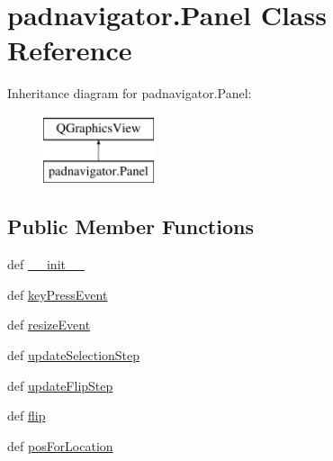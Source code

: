 \hypertarget{classpadnavigator_1_1Panel}{}\section{padnavigator.\+Panel Class Reference}
\label{classpadnavigator_1_1Panel}
Inheritance diagram for padnavigator.\+Panel\+:\begin{figure}[H]
\begin{center}
\leavevmode
\includegraphics[height=2.000000cm]{classpadnavigator_1_1Panel}
\end{center}
\end{figure}
\subsection*{Public Member Functions}
\begin{DoxyCompactItemize}
\item 
def \hyperlink{classpadnavigator_1_1Panel_a69cc20173f435211c71021307b2e4941}{\+\_\+\+\_\+init\+\_\+\+\_\+}
\item 
def \hyperlink{classpadnavigator_1_1Panel_a72c6947210f5af9be5c73d3b4794da83}{key\+Press\+Event}
\item 
def \hyperlink{classpadnavigator_1_1Panel_ac76adf381c19aff1654817b601c3d75d}{resize\+Event}
\item 
def \hyperlink{classpadnavigator_1_1Panel_a7c98529a7792928b658a30edbb3bd201}{update\+Selection\+Step}
\item 
def \hyperlink{classpadnavigator_1_1Panel_ace275940c9bff714d8f36a7f75ce7299}{update\+Flip\+Step}
\item 
def \hyperlink{classpadnavigator_1_1Panel_a695f0907f4d6a473205f7bbd1b9f4007}{flip}
\item 
def \hyperlink{classpadnavigator_1_1Panel_a0db2ab48af54796027794cfd150300da}{pos\+For\+Location}
\end{DoxyCompactItemize}
